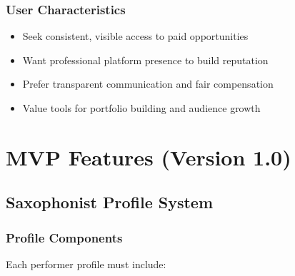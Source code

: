\documentclass[11pt,a4paper]{article}
\begin{document}
\subsubsection{User Characteristics}
\begin{itemize}[leftmargin=1.5em]
  \item Seek consistent, visible access to paid opportunities
  \item Want professional platform presence to build reputation
  \item Prefer transparent communication and fair compensation
  \item Value tools for portfolio building and audience growth
\end{itemize}

\section{MVP Features (Version 1.0)}

\subsection{Saxophonist Profile System}

\subsubsection{Profile Components}
Each performer profile must include:
\end{document}
